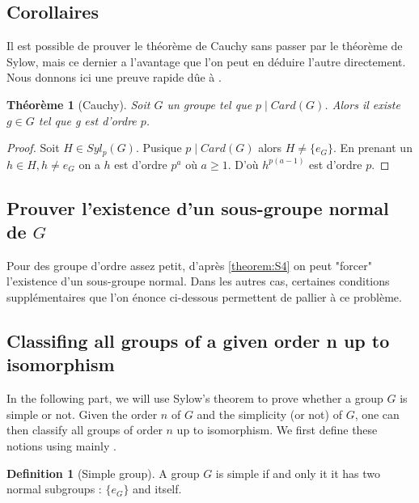 \documentclass{article}
\theoremstyle{definition}
\theoremstyle{plain}
\newtheorem{theorem}[subsubsection]{Théorème}
\theoremstyle{plain}
\theoremstyle{plain}
\theoremstyle{plain}
\theoremstyle{plain}
\theoremstyle{definition}
\newtheorem{defeng}[subsubsection]{Definition}
\theoremstyle{plain}
\theoremstyle{plain}
\begin{document}
\subsection{Corollaires}

Il est possible de prouver le théorème de Cauchy sans passer par le théorème de Sylow, mais 
ce dernier a l'avantage que l'on peut en déduire l'autre directement. Nous donnons ici une 
preuve rapide dûe à \cite{serre1979ens}.

\begin{theorem}[Cauchy]
	Soit \( G \) un groupe tel que \( p \mid Card(G) \). Alors il existe \( g \in G \) tel que g est d'ordre \( p \).
\end{theorem}

\begin{proof}
	Soit \( H \in Syl_p(G) \). Pusique \( p \mid Card(G) \) alors \( H \neq \{e_G\} \). 
	En prenant un \( h \in H, h \neq e_G \)
	on a \( h \) est d'ordre \( p^{a} \) où \( a \geq 1 \). 
	D'où \( h^{p(a-1)} \) est d'ordre \( p \).
\end{proof}

\subsection{Prouver l'existence d'un sous-groupe normal de \ensuremath{G}}

Pour des groupe d'ordre assez petit, d'après \cref{theorem:S4} on peut "forcer" l'existence d'un sous-groupe normal. Dans les autres cas, certaines conditions supplémentaires que l'on énonce ci-dessous permettent de pallier à ce problème.
\cite[p. ~142]{dummit2003abstract}

\subsection{Classifing all groups of a given order n up to isomorphism}

\par In the following part, we will use Sylow's theorem to prove whether a group \( G \) is simple or not. Given the order \( n \) of \( G \) and the simplicity (or not) of \( G \), one can then classify all groups of order \( n \) up to isomorphism. We first define these notions using mainly \cite[p.~103]{dummit2003abstract}.


\begin{defeng}[Simple group]
	A group \( G \) is simple if and only it it has two normal subgroups : 
	\( \{e_G\} \) and itself.
\end{defeng}
\end{document}
